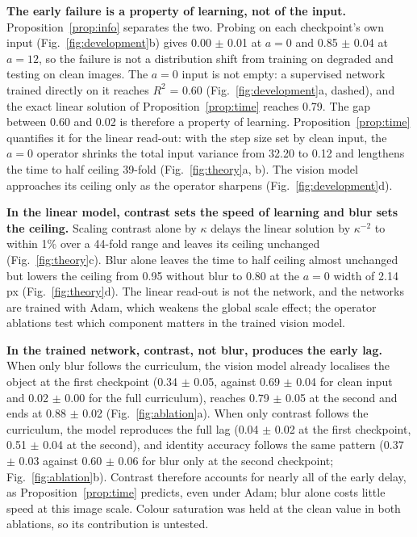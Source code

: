 \documentclass{article}
\theoremstyle{plain}
\theoremstyle{remark}
\begin{document}
\textbf{The early failure is a property of learning, not of the input.} Proposition~\ref{prop:info} separates the two. Probing on each checkpoint's own input (Fig.~\ref{fig:development}b) gives 0.00 \ensuremath{\pm} 0.01 at \(a=0\) and 0.85 \ensuremath{\pm} 0.04 at \(a=12\), so the failure is not a distribution shift from training on degraded and testing on clean images. The \(a=0\) input is not empty: a supervised network trained directly on it reaches \(R^2\) = 0.60 (Fig.~\ref{fig:development}a, dashed), and the exact linear solution of Proposition~\ref{prop:time} reaches 0.79. The gap between 0.60 and 0.02 is therefore a property of learning. Proposition~\ref{prop:time} quantifies it for the linear read-out: with the step size set by clean input, the \(a=0\) operator shrinks the total input variance from 32.20 to 0.12 and lengthens the time to half ceiling 39-fold (Fig.~\ref{fig:theory}a, b). The vision model approaches its ceiling only as the operator sharpens (Fig.~\ref{fig:development}d).

\textbf{In the linear model, contrast sets the speed of learning and blur sets the ceiling.} Scaling contrast alone by \(\kappa\) delays the linear solution by \(\kappa^{-2}\) to within 1\% over a 44-fold range and leaves its ceiling unchanged (Fig.~\ref{fig:theory}c). Blur alone leaves the time to half ceiling almost unchanged but lowers the ceiling from 0.95 without blur to 0.80 at the \(a=0\) width of 2.14 px (Fig.~\ref{fig:theory}d). The linear read-out is not the network, and the networks are trained with Adam, which weakens the global scale effect; the operator ablations test which component matters in the trained vision model.

\textbf{In the trained network, contrast, not blur, produces the early lag.} When only blur follows the curriculum, the vision model already localises the object at the first checkpoint (0.34 \ensuremath{\pm} 0.05, against 0.69 \ensuremath{\pm} 0.04 for clean input and 0.02 \ensuremath{\pm} 0.00 for the full curriculum), reaches 0.79 \ensuremath{\pm} 0.05 at the second and ends at 0.88 \ensuremath{\pm} 0.02 (Fig.~\ref{fig:ablation}a). When only contrast follows the curriculum, the model reproduces the full lag (0.04 \ensuremath{\pm} 0.02 at the first checkpoint, 0.51 \ensuremath{\pm} 0.04 at the second), and identity accuracy follows the same pattern (0.37 \ensuremath{\pm} 0.03 against 0.60 \ensuremath{\pm} 0.06 for blur only at the second checkpoint; Fig.~\ref{fig:ablation}b). Contrast therefore accounts for nearly all of the early delay, as Proposition~\ref{prop:time} predicts, even under Adam; blur alone costs little speed at this image scale. Colour saturation was held at the clean value in both ablations, so its contribution is untested.
\end{document}
